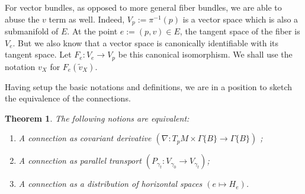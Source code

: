 \documentclass[11pt]{article}
\newtheorem{theorem}{Theorem}
\theoremstyle{remark}
\begin{document}
For vector bundles, as opposed to more general fiber bundles, we are
able to abuse the $v$ term as well. 
Indeed, $V_p \ensuremath{:=} \pi^{-1} (p)$ is a vector space which is also a submanifold
of $E$. At the point $e \ensuremath{:=} (p, v) \in E$, the tangent space of the
fiber is $V_e$. 
But we also know that a vector space is canonically identifiable with
its tangent space. Let $F_e : V_e \to V_p$ be this canonical
isomorphism. We shall use the notation $v_X$ for  $F_e(\tilde{v}_X)$. 

Having setup the basic notations and definitions, we are in a position
to sketch the equivalence of the connections. 
\begin{theorem}
The following notions are equivalent:
\begin{enumerate}
\item
A connection as covariant derivative $(\nabla: T_pM \times
\ensuremath{\Gamma \{ B \}} \to \ensuremath{\Gamma \{ B \}})$ ; 
\item A connection as parallel transport $(P_{\gamma_t}:
V_{\gamma_0} \to V_{\gamma_t} )$; 
\item A connection as a distribution of horizontal spaces $(e \mapsto
H_e)$. 
\end{enumerate}
\end{theorem}
\end{document}
